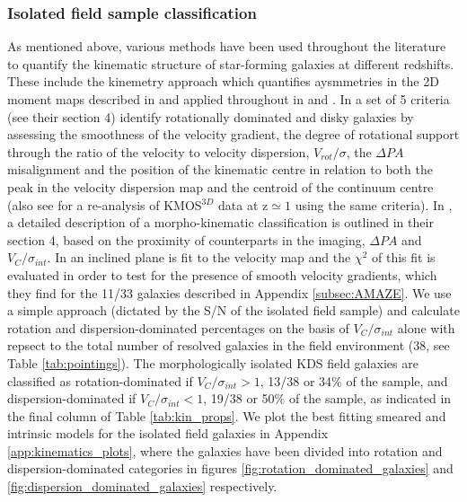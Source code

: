 \documentclass[fleqn,usenatbib]{mn2e}
\begin{document}
\subsubsection{Isolated field sample classification}\label{subsubsection:isolated_classification}
As mentioned above, various methods have been used throughout the literature to quantify the kinematic structure of star-forming galaxies at different redshifts. 
These include the kinemetry approach which quantifies aysmmetries in the 2D moment maps described in \cite{Shapiro2008} and applied throughout in \cite{ForsterSchreiber2009} and \cite{Cresci2009}.
In \cite{Wisnioski2015} a set of 5 criteria (see their section 4) identify rotationally dominated and disky galaxies by assessing the smoothness of the velocity gradient, the degree of rotational support through the ratio of the velocity to velocity dispersion, $V_{rot}/\sigma$, the $\Delta PA$ misalignment and the position of the kinematic centre in relation to both the peak in the velocity dispersion map and the centroid of the continuum centre (also see \cite{Rodrigues2016} for a re-analysis of KMOS$^{3D}$ data at z$\simeq1$ using the same criteria).   
In \cite{Epinat2012}, a detailed description of a morpho-kinematic classification is outlined in their section 4, based on the proximity of counterparts in the imaging, $\Delta PA$ and $V_{C}/\sigma_{int}$.
In \cite{Gnerucci2011} an inclined plane is fit to the velocity map and the $\chi^{2}$ of this fit is evaluated in order to test for the presence of smooth velocity gradients, which they find for the 11/33 galaxies described in Appendix \ref{subsec:AMAZE}.
We use a simple approach (dictated by the S/N of the isolated field sample) and calculate rotation and dispersion-dominated percentages on the basis of $V_{C}/\sigma_{int}$ alone with repsect to the total number of resolved galaxies in the field environment (38, see Table \ref{tab:pointings}).
The morphologically isolated KDS field galaxies are classified as rotation-dominated if $V_{C}/\sigma_{int} > 1$, 13/38 or 34\% of the sample, and dispersion-dominated if $V_{C}/\sigma_{int} < 1$, 19/38 or 50\% of the sample, as indicated in the final column of Table \ref{tab:kin_props}.
We plot the best fitting smeared and intrinsic models for the isolated field galaxies in Appendix \ref{app:kinematics_plots}, where the galaxies have been divided into rotation and dispersion-dominated categories in figures \ref{fig:rotation_dominated_galaxies} and \ref{fig:dispersion_dominated_galaxies} respectively.
\end{document}

